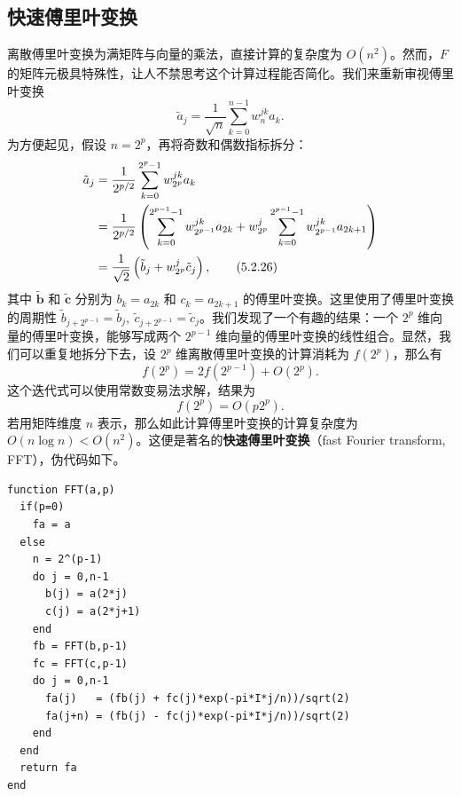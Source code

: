 \subsection{快速傅里叶变换}

离散傅里叶变换为满矩阵与向量的乘法，直接计算的复杂度为 $O(n^2)$。然而，$F$ 的矩阵元极具特殊性，让人不禁思考这个计算过程能否简化。我们来重新审视傅里叶变换
\begin{equation}
\tilde a_j=\frac1{\sqrt n}\sum_{k=0}^{n-1}w_n^{jk}a_k.
\tag{5.2.25}
\end{equation}
为方便起见，假设 $n=2^p$，再将奇数和偶数指标拆分：
\begin{align}
\tilde a_j
&=\frac1{2^{p/2}}\sum_{k=0}^{2^p-1}w_{2^p}^{jk}a_k\notag\\
&=\frac1{2^{p/2}}\left(
\sum_{k=0}^{2^{p-1}-1}w_{2^{p-1}}^{jk}a_{2k}
+w_{2^p}^{j}\sum_{k=0}^{2^{p-1}-1}w_{2^{p-1}}^{jk}a_{2k+1}
\right)\notag\\
&=\frac1{\sqrt2}\left(\tilde b_j+w_{2^p}^{j}\tilde c_j\right),
\tag{5.2.26}
\end{align}
其中 $\tilde{\bm b}$ 和 $\tilde{\bm c}$ 分别为 $b_k=a_{2k}$ 和 $c_k=a_{2k+1}$ 的傅里叶变换。这里使用了傅里叶变换的周期性 $\tilde b_{j+2^{p-1}}=\tilde b_j,\ \tilde c_{j+2^{p-1}}=\tilde c_j$。我们发现了一个有趣的结果：一个 $2^p$ 维向量的傅里叶变换，能够写成两个 $2^{p-1}$ 维向量的傅里叶变换的线性组合。显然，我们可以重复地拆分下去，设 $2^p$ 维离散傅里叶变换的计算消耗为 $f(2^p)$，那么有
\begin{equation}
f(2^p)=2f(2^{p-1})+O(2^p).
\tag{5.2.27}
\end{equation}
这个迭代式可以使用常数变易法求解，结果为
\begin{equation}
f(2^p)=O(p2^p).
\tag{5.2.28}
\end{equation}
若用矩阵维度 $n$ 表示，那么如此计算傅里叶变换的计算复杂度为 $O(n\log n)<O(n^2)$。这便是著名的\textbf{快速傅里叶变换}（fast Fourier transform, FFT），伪代码如下。

\begin{algorithmBox}
\begin{lstlisting}[style=bellacode]
function FFT(a,p)
  if(p=0)
    fa = a
  else
    n = 2^(p-1)
    do j = 0,n-1
      b(j) = a(2*j)
      c(j) = a(2*j+1)
    end
    fb = FFT(b,p-1)
    fc = FFT(c,p-1)
    do j = 0,n-1
      fa(j)   = (fb(j) + fc(j)*exp(-pi*I*j/n))/sqrt(2)
      fa(j+n) = (fb(j) - fc(j)*exp(-pi*I*j/n))/sqrt(2)
    end
  end
  return fa
end
\end{lstlisting}
\end{algorithmBox}

